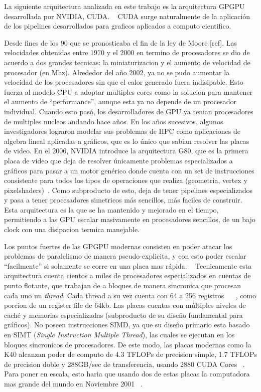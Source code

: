 La siguiente arquitectura analizada en este trabajo es la arquitectura GPGPU desarrollada por NVIDIA, CUDA.
~\cite{cudaHandbook} CUDA surge naturalmente de la aplicaci\'on de los pipelines desarrollados para
graficos aplicados a computo cientifico.

Desde fines de los 90 que se pronosticaba el fin de la ley de Moore [ref]. Las velocidades obtenidas
entre 1970 y el 2000 en termino de procesadores se dio de acuerdo a dos grandes tecnicas: la miniaturizacion
y el aumento de velocidad de procesador (en Mhz). Alrededor del a\~no 2002, ya no se pudo aumentar
la velocidad de los procesadores sin que el calor generado fuera indisipable. Esto fuerza al modelo
CPU a adoptar multiples cores como la solucion para mantener el aumento de ``performance'', aunque esta
ya no depende de un procesador individual. Cuando esto pas\'o, los desarrolladores de GPU ya tenian
procesadores de multiples nucleos andando hace a\~nos. En los a\~nos sucesivos, algunos investigadores
lograron modelar sus problemas de HPC como aplicaciones de algebra lineal aplicadas a gr\'aficos, que es
lo \'unico que sabian resolver las placas de video. En el 2006, NVIDIA introduce la arquitectura G80,
que es la primera placa de video que deja de resolver \'unicamente problemas especializados a gr\'aficos
para pasar a un motor gen\'erico donde cuenta con un set de instrucciones consistente para todos los
tipos de operaciones que realiza (geometria, vertex y pixelshaders)~\cite{}. Como subproducto de esto,
deja de tener pipelines especializados y pasa a tener procesadores simetricos m\'as sencillos, m\'as
faciles de construir. Esta arquitectura es la que se ha mantenido y mejorado en el tiempo, permitiendo
a las GPU escalar masivamente en procesadores sencillos, de un bajo clock con una disipacion termica
manejable.

Los puntos fuertes de las GPGPU modernas consisten en poder atacar los problemas de paralelismo
de manera pseudo-explicita, y con esto poder escalar ``facilmente'' si solamente se corre en una
placa mas r\'apida. ~\cite{} Tecnicamente esta arquitectura cuenta cientos a miles de procesadores
especializados en cuentas de punto flotante, que trabajan de a bloques de manera sincronica
 que procesan cada uno un \textit{thread}. Cada thread a su vez cuenta con
64 a 256 registros ~\cite{NvidiaFermi} ~\cite{NvidiaKepler}, como porcion de un register file de 64kb.
Las placas cuentas con m\'ultiples niveles de cach\'e y memorias especializadas (subproducto de
su dise\~no fundamental para gr\'aficos). No poseen instrucciones SIMD, ya que su dise\~no primario
esta basado en SIMT (\textit{Single Instruction Multiple Thread}), las cuales se ejecutan en los
bloques sincronicos de procesadores. De este modo, las placas modernas como la K40 alcanzan
poder de computo de 4.3 TFLOPs de precision simple, 1.7 TFLOPs de precision doble y 288GB/sec de
transferencia, usando 2880 CUDA Cores ~\cite{NvidiaKeplerDatasheet}. Para poner en escala, esto haria
que usando dos de estas placas la computadora mas grande del mundo en Noviembre
2001 ~\cite{Top500_2001Noviembre}.

